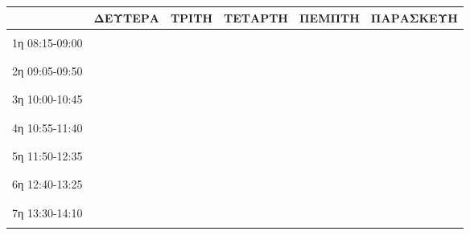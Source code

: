 \documentclass[a4paper,landscape,2pt]{book}
\begin{document}
\bigskip
\begin{tabular}{|c|p{4cm}|p{4cm}|p{4cm}|p{4cm}|p{4cm}|}
    \hline
                   & \centering ΔΕΥΤΕΡΑ & \centering ΤΡΙΤΗ & \centering ΤΕΤΑΡΤΗ & \centering ΠΕΜΠΤΗ & \hspace{.8cm} ΠΑΡΑΣΚΕΥΗ  \\
    \hline
                   &         &       &         &        &           \\
    1η 08:15-09:00 &         &       &         &        &           \\
                   &         &       &         &        &           \\
    \hline
                   &         &       &         &        &           \\
    2η 09:05-09:50 &         &       &         &        &           \\
                   &         &       &         &        &           \\
    \hline
                   &         &       &         &        &           \\
    3η 10:00-10:45 &         &       &         &        &           \\
                   &         &       &         &        &           \\
    \hline
                   &         &       &         &        &           \\
    4η 10:55-11:40 &         &       &         &        &           \\
                   &         &       &         &        &           \\
    \hline
                   &         &       &         &        &           \\
    5η 11:50-12:35 &         &       &         &        &           \\
                   &         &       &         &        &           \\
    \hline
                   &         &       &         &        &           \\
    6η 12:40-13:25 &         &       &         &        &           \\
                   &         &       &         &        &           \\
    \hline
                   &         &       &         &        &           \\
    7η 13:30-14:10 &         &       &         &        &           \\
                   &         &       &         &        &           \\
    \hline
\end{tabular}
\end{document}
